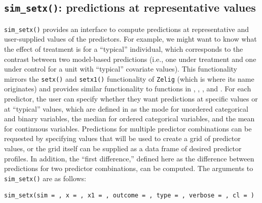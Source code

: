 \subsection{\texorpdfstring{\texttt{sim\_setx()}: predictions at representative values}{sim\_setx(): predictions at representative values}}\label{sim_setx-predictions-at-representative-values}
\texttt{sim\_setx()} provides an interface to compute predictions at representative and user-supplied values of the predictors. For example, we might want to know what the effect of treatment is for a ``typical'' individual, which corresponds to the contrast between two model-based predictions (i.e., one under treatment and one under control for a unit with ``typical'' covariate values). This functionality mirrors the \texttt{setx()} and \texttt{setx1()} functionality of \texttt{Zelig} (which is where its name originates) and provides similar functionality to functions in , , , and .
For each predictor, the user can specify whether they want predictions at specific values or at ``typical'' values, which are defined in  as the mode for unordered categorical and binary variables, the median for ordered categorical variables, and the mean for continuous variables. Predictions for multiple predictor combinations can be requested by specifying values that will be used to create a grid of predictor values, or the grid itself can be supplied as a data frame of desired predictor profiles. In addition, the ``first difference,'' defined here as the difference between predictions for two predictor combinations, can be computed.
The arguments to \texttt{sim\_setx()} are as follows:
\begin{verbatim}
sim_setx(sim = , x = , x1 = , outcome = , type = , verbose = , cl = )
\end{verbatim}
